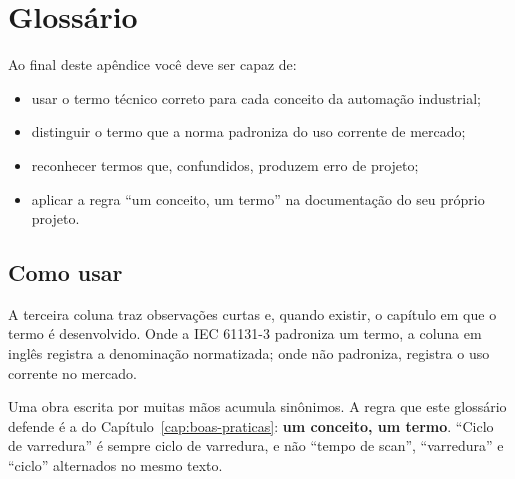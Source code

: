 \chapter{Glossário}
\label{apC}

\begin{objetivos}
Ao final deste apêndice você deve ser capaz de:
\begin{itemize}
  \item usar o termo técnico correto para cada conceito da automação industrial;
  \item distinguir o termo que a norma padroniza do uso corrente de mercado;
  \item reconhecer termos que, confundidos, produzem erro de projeto;
  \item aplicar a regra ``um conceito, um termo'' na documentação do seu próprio projeto.
\end{itemize}
\end{objetivos}

\section{Como usar}

A terceira coluna traz observações curtas e, quando existir, o capítulo em que o termo é
desenvolvido. Onde a IEC 61131-3 padroniza um termo, a coluna em inglês registra a denominação
normatizada; onde não padroniza, registra o uso corrente no mercado.

Uma obra escrita por muitas mãos acumula sinônimos. A regra que este glossário defende é a do
Capítulo~\ref{cap:boas-praticas}: \textbf{um conceito, um termo}. ``Ciclo de varredura'' é sempre ciclo
de varredura, e não ``tempo de scan'', ``varredura'' e ``ciclo'' alternados no mesmo texto.


